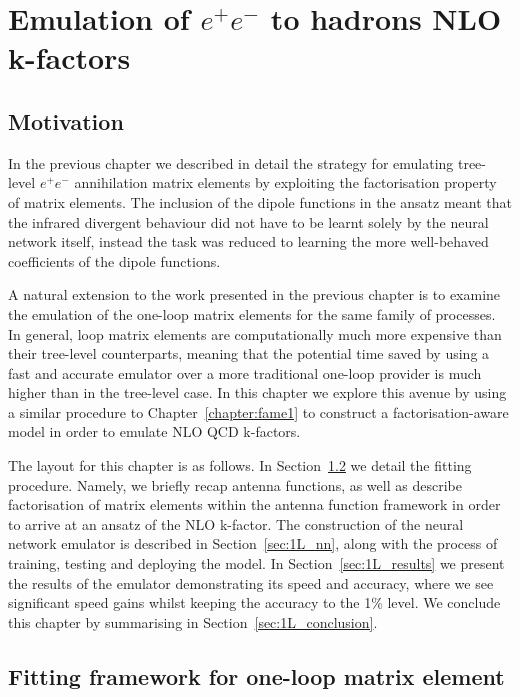 \documentclass[main.tex]{subfiles}
\begin{document}
\chapter{Emulation of $e^{+}e^{-}$ to hadrons NLO k-factors}
\label{chapter:fame2}

\section{Motivation}
In the previous chapter we described in detail the strategy for emulating
tree-level $e^{+}e^{-}$ annihilation matrix elements by exploiting the factorisation
property of matrix elements. The inclusion of the dipole functions in the ansatz
meant that the infrared divergent behaviour did not have
to be learnt solely by the neural network itself, instead the task was reduced
to learning the more well-behaved coefficients of the dipole functions.

A natural extension to the work presented in the previous chapter is
to examine the emulation of the one-loop matrix elements for the same family of processes.
In general, loop matrix elements are computationally much more expensive than
their tree-level counterparts, meaning that the potential time saved by using
a fast and accurate emulator over a more traditional one-loop provider is much higher
than in the tree-level case.
In this chapter we explore this avenue by using a similar procedure to Chapter~\ref{chapter:fame1}
to construct a factorisation-aware model in order to emulate NLO QCD k-factors.

The layout for this chapter is as follows. In Section~\ref{sec:1L_fitting} we detail
the fitting procedure. Namely, we briefly recap antenna functions, as well as describe
factorisation of matrix elements within the antenna function framework in order to
arrive at an ansatz of the NLO k-factor. The construction of the neural network emulator
is described in Section~\ref{sec:1L_nn}, along with the process of training, testing and
deploying the model. In Section~\ref{sec:1L_results} we present the results of the
emulator demonstrating its speed and accuracy, where we see significant speed gains
whilst keeping the accuracy to the 1\% level. We conclude
this chapter by summarising in Section~\ref{sec:1L_conclusion}.

\section{Fitting framework for one-loop matrix element}\label{sec:1L_fitting}
\end{document}

